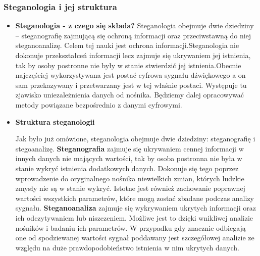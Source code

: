 \documentclass[a4paper,titleauthor]{mwart}
\begin{document}
	\subsubsection{Steganologia i jej struktura}
	\begin{itemize}
		\item \textbf {Steganologia - z czego się składa?}\newline \newline
		Steganologia obejmuje dwie dziedziny – steganografię zajmującą się ochroną informacji oraz przeciwstawną do niej steganoanalizę. Celem tej nauki jest ochrona informacji.\newline \newline  Steganologia nie dokonuje przekształceń informacji lecz zajmuje się ukrywaniem jej istnienia, tak by osoby postronne nie były w stanie stwierdzić jej istnienia.\newline \newline  Obecnie najczęściej wykorzystywana jest postać cyfrowa sygnału dźwiękowego a on sam przekazywany i przetwarzany jest w tej właśnie postaci. Występuje tu zjawisko uniezależnienia danych od nośnika. Będziemy dalej opracowywać metody powiązane bezpośrednio z danymi cyfrowymi.
		
		\item \textbf {Struktura steganologii}\newline \newline
		
		Jak było już omówione, steganologia obejmuje dwie dziedziny: steganografię i stegoanalizę.\newline \newline
		\textbf{Steganografia} zajmuje się ukrywaniem cennej informacji w innych danych nie mających wartości, tak by osoba postronna nie była w stanie wykryć istnienia dodatkowych danych. Dokonuje się tego poprzez wprowadzenie do oryginalnego nośnika niewielkich zmian, których ludzkie zmysły nie są w stanie wykryć. Istotne jest również zachowanie poprawnej wartości wszystkich parametrów, które mogą zostać zbadane podczas analizy sygnału. \newline \newline
		\textbf{Steganoanaliza} zajmuje się wykrywaniem ukrytych informacji oraz ich odczytywaniem lub niszczeniem. \newline Możliwe jest to dzięki wnikliwej analizie nośników i badaniu ich parametrów. W przypadku gdy znacznie odbiegają one od spodziewanej wartości sygnał poddawany jest szczegółowej analizie ze względu na duże prawdopodobieństwo istnienia w nim ukrytych danych. \newline
	\end{itemize}
	
\end{document}
